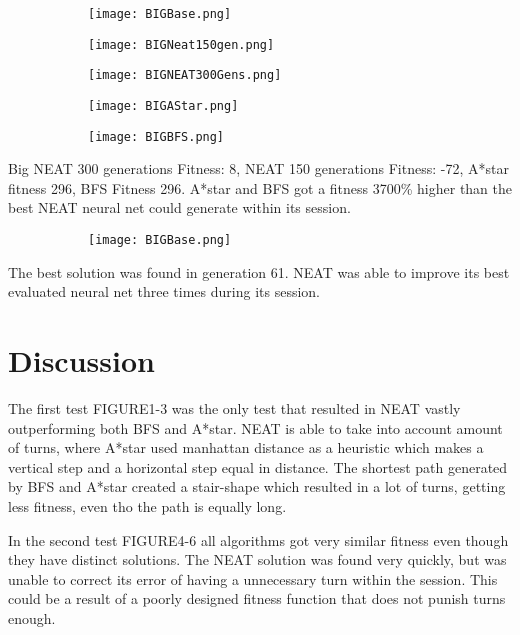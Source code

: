 \documentclass{kththesis}
\begin{document}
\begin{figure}[h]
\begin{subfigure}{0.2\textwidth}
\texttt{[image: BIGBase.png]}
\end{subfigure}
\begin{subfigure}{0.2\textwidth}
\texttt{[image: BIGNeat150gen.png]}
\end{subfigure}
\begin{subfigure}{0.2\textwidth}
\texttt{[image: BIGNEAT300Gens.png]}
\end{subfigure}
\begin{subfigure}{0.2\textwidth}
\texttt{[image: BIGAStar.png]}
\end{subfigure}
\begin{subfigure}{0.2\textwidth}
\texttt{[image: BIGBFS.png]}
\end{subfigure}
\end{figure}
Big NEAT 300 generations Fitness: 8, NEAT 150 generations Fitness: -72, A*star fitness 296, BFS Fitness 296. A*star and BFS got a fitness 3700\% higher than the best NEAT neural net could generate within its session.


\begin{figure}[h]
\begin{subfigure}{0.2\textwidth}
\texttt{[image: BIGBase.png]}
\end{subfigure}
\end{figure}
The best solution was found in generation 61. NEAT was able to improve its best evaluated neural net three times during its session.

\chapter{Discussion}
The first test FIGURE1-3 was the only test that resulted in NEAT vastly outperforming both BFS and A*star. NEAT is able to take into account amount of turns, where A*star used manhattan distance as a heuristic which makes a vertical step and a horizontal step equal in distance. The shortest path generated by BFS and A*star created a stair-shape which resulted in a lot of turns, getting less fitness, even tho the path is equally long. 

In the second test FIGURE4-6 all algorithms got very similar fitness even though they have distinct solutions. The NEAT solution was found very quickly, but was unable to correct its error of having a unnecessary turn within the session. This could be a result of a poorly designed fitness function that does not punish turns enough. 
\end{document}
